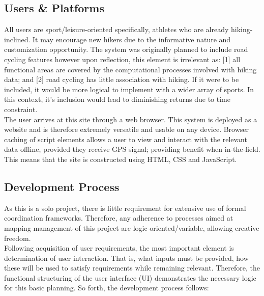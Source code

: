 \documentclass[11pt, english]{article}
\begin{document}
	\subsection{Users \& Platforms}

	All users are sport/leisure-oriented specifically, athletes who are already hiking-inclined. It may encourage new hikers due to the informative nature and customization opportunity. The system was originally planned to include road cycling features however upon reflection, this element is irrelevant as: [1] all functional areas are covered by the computational processes involved with hiking data; and [2] road cycling has little association with hiking. If it were to be included, it would be more logical to implement with a wider array of sports. In this context, it's inclusion would lead to diminishing returns due to time constraint.\\

	The user arrives at this site through a web browser. This system is deployed as a website and is therefore extremely versatile and usable on any device. Browser caching of script elements allows a user to view and interact with the relevant data offline, provided they receive GPS signal; providing benefit when in-the-field. This means that the site is constructed using HTML, CSS and JavaScript.

	\subsection{Development Process}

	As this is a solo project, there is little requirement for extensive use of formal coordination frameworks. Therefore, any adherence to processes aimed at mapping management of this project are logic-oriented/variable, allowing creative freedom.\\

	Following acquisition of user requirements, the most important element is determination of user interaction. That is, what inputs must be provided, how these will be used to satisfy requirements while remaining relevant. Therefore, the functional structuring of the user interface (UI) demonstrates the necessary logic for this basic planning. So forth, the development process follows:
\end{document}

